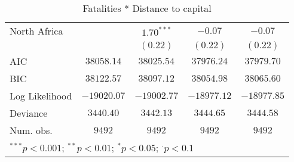 \begin{sidewaystable}
\begin{center}
{\begin{tabular}{l c c c c}
North Africa                             &               & $1.70^{***}$  & $-0.07$       & $-0.07$       \\
                                         &               & $(0.22)$      & $(0.22)$      & $(0.22)$      \\
\midrule
AIC                                      & $38058.14$    & $38025.54$    & $37976.24$    & $37979.70$    \\
BIC                                      & $38122.57$    & $38097.12$    & $38054.98$    & $38065.60$    \\
Log Likelihood                           & $-19020.07$   & $-19002.77$   & $-18977.12$   & $-18977.85$   \\
Deviance                                 & $3440.40$     & $3442.13$     & $3444.65$     & $3444.58$     \\
Num. obs.                                & $9492$        & $9492$        & $9492$        & $9492$        \\
\bottomrule
\multicolumn{5}{l}{\scriptsize{$^{***}p<0.001$; $^{**}p<0.01$; $^{*}p<0.05$; $^{\cdot}p<0.1$}}
\end{tabular}
}
\caption{Fatalities * Distance to capital}
\label{newinteraction_interdeaths}
\end{center}
\end{sidewaystable}
